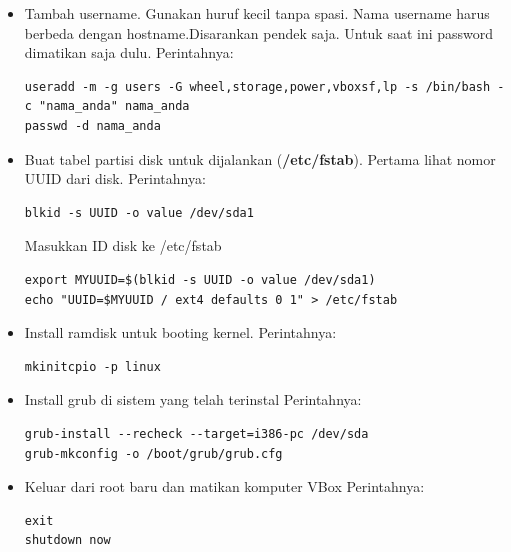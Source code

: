\documentclass[12pt,]{article}
\begin{document}
\begin{itemize}
		\item Tambah username. Gunakan huruf kecil tanpa spasi.
		Nama username harus berbeda dengan hostname.Disarankan pendek saja.
		Untuk saat ini password dimatikan saja dulu.	
		Perintahnya:
		\begin{verbatim}
useradd -m -g users -G wheel,storage,power,vboxsf,lp -s /bin/bash -c "nama_anda" nama_anda
passwd -d nama_anda
		\end{verbatim}
		
		\item Buat tabel partisi disk untuk dijalankan (\textbf{/etc/fstab}).
		Pertama lihat nomor UUID dari disk. Perintahnya:
		\begin{verbatim}
blkid -s UUID -o value /dev/sda1
		\end{verbatim}
		Masukkan ID disk ke /etc/fstab
		\begin{verbatim}
export MYUUID=$(blkid -s UUID -o value /dev/sda1)
echo "UUID=$MYUUID / ext4 defaults 0 1" > /etc/fstab
		\end{verbatim}
		
		\item Install ramdisk untuk booting kernel.
		Perintahnya:
		\begin{verbatim}
mkinitcpio -p linux
		\end{verbatim}
		
		\item Install grub di sistem yang telah terinstal
		Perintahnya:
		\begin{verbatim}
grub-install --recheck --target=i386-pc /dev/sda
grub-mkconfig -o /boot/grub/grub.cfg
		\end{verbatim}
		
		\item Keluar dari root baru dan matikan komputer VBox
		Perintahnya:
		\begin{verbatim}
exit
shutdown now
		\end{verbatim}
	
	\end{itemize}
	
\end{document}
